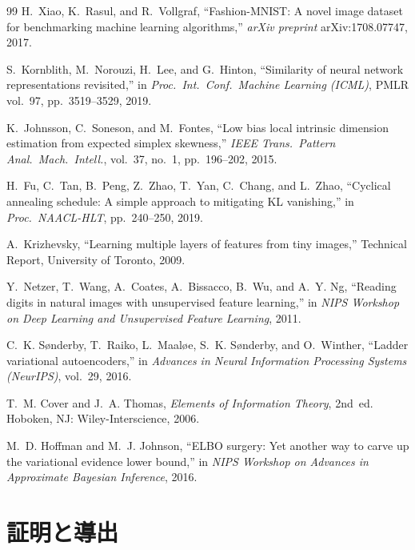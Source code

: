 \documentclass[11pt,a4paper]{jsarticle}
\begin{document}
\begin{thebibliography}{99}
H.~Xiao, K.~Rasul, and R.~Vollgraf,
``Fashion-MNIST: A novel image dataset for benchmarking machine learning
algorithms,''
\textit{arXiv preprint} arXiv:1708.07747, 2017.

S.~Kornblith, M.~Norouzi, H.~Lee, and G.~Hinton,
``Similarity of neural network representations revisited,''
in \textit{Proc.\ Int.\ Conf.\ Machine Learning (ICML)}, PMLR vol.~97,
pp.~3519--3529, 2019.

K.~Johnsson, C.~Soneson, and M.~Fontes,
``Low bias local intrinsic dimension estimation from expected simplex
skewness,''
\textit{IEEE Trans.\ Pattern Anal.\ Mach.\ Intell.}, vol.~37, no.~1,
pp.~196--202, 2015.

H.~Fu, C.~Tan, B.~Peng, Z.~Zhao, T.~Yan, C.~Chang, and L.~Zhao,
``Cyclical annealing schedule: A simple approach to mitigating KL
vanishing,''
in \textit{Proc.\ NAACL-HLT}, pp.~240--250, 2019.

A.~Krizhevsky,
``Learning multiple layers of features from tiny images,''
Technical Report, University of Toronto, 2009.

Y.~Netzer, T.~Wang, A.~Coates, A.~Bissacco, B.~Wu, and A.~Y. Ng,
``Reading digits in natural images with unsupervised feature learning,''
in \textit{NIPS Workshop on Deep Learning and Unsupervised Feature
Learning}, 2011.

C.~K. S{\o}nderby, T.~Raiko, L.~Maal{\o}e, S.~K. S{\o}nderby, and O.~Winther,
``Ladder variational autoencoders,''
in \textit{Advances in Neural Information Processing Systems (NeurIPS)},
vol.~29, 2016.

T.~M. Cover and J.~A. Thomas,
\textit{Elements of Information Theory}, 2nd~ed.
Hoboken, NJ: Wiley-Interscience, 2006.

M.~D. Hoffman and M.~J. Johnson,
``ELBO surgery: Yet another way to carve up the variational evidence lower
bound,''
in \textit{NIPS Workshop on Advances in Approximate Bayesian Inference},
2016.

\end{thebibliography}

\appendix

\section{証明と導出}\label{app:proofs}
\end{document}
